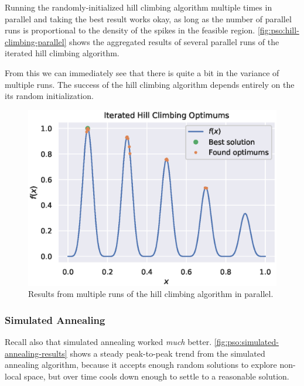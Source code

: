 \documentclass[12pt]{article}
\begin{document}
Running the randomly-initialized hill climbing algorithm multiple times in parallel and taking the best result works okay, as long as the number of parallel runs is proportional to the density of the spikes in the feasible region.
\autoref{fig:pso:hill-climbing-parallel} shows the aggregated results of several parallel runs of the iterated hill climbing algorithm.

From this we can immediately see that there is quite a bit in the variance of multiple runs.
The success of the hill climbing algorithm depends entirely on the its random initialization.

\begin{figure}[H]
    \centering
    \includegraphics{figures/pso/prob1-hill-climbing-solution.eps}
    \caption{Results from multiple runs of the hill climbing algorithm in parallel.}\label{fig:pso:hill-climbing-parallel}
\end{figure}

\subsubsection{Simulated Annealing}
Recall also that simulated annealing worked \textit{much} better.
\autoref{fig:pso:simulated-annealing-results} shows a steady peak-to-peak trend from the simulated annealing algorithm, because it accepts enough random solutions to explore non-local space, but over time cools down enough to settle to a reasonable solution.
\end{document}
